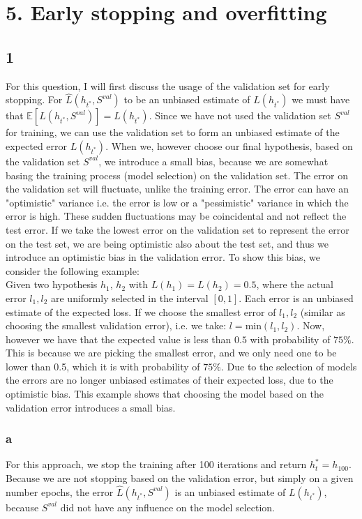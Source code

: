 \documentclass{article}
\begin{document}
\section{5. Early stopping and overfitting}
\subsection{1}
% 
% 
For this question, I will first discuss the usage of the validation set for early stopping. For $\hat{L}(h_{t^*},S^{val})$ to be an unbiased estimate of $L(h_{t^*})$ we must have that $\mathbb{E}[\hat{L}(h_{t^*},S^{val})] = L(h_{t^*})$. Since we have not used the validation set $S^{val}$ for training, we can use the validation set to form an unbiased estimate of the expected error $L(h_{t^*})$. When we, however choose our final hypothesis, based on the validation set $S^{val}$, we introduce a small bias, because we are somewhat basing the training process (model selection) on the validation set. The error on the validation set will fluctuate, unlike the training error. The error can have an "optimistic" variance i.e. the error is low or a "pessimistic" variance in which the error is high. These sudden fluctuations may be coincidental and not reflect the test error. If we take the lowest error on the validation set to represent the error on the test set, we are being optimistic also about the test set, and thus we introduce an optimistic bias in the validation error. To show this bias, we consider the following example:\\
Given two hypothesis $h_1$, $h_2$ with $L(h_1) = L(h_2) = 0.5$, where the actual error $l_1, l_2$ are uniformly selected in the interval $[0,1]$. Each error is an unbiased estimate of the expected loss. If we choose the smallest error of $l_1, l_2$ (similar as choosing the smallest validation error), i.e. we take: $l= \text{min}(l_1,l_2)$. Now, however we have that the expected value is less than $0.5$ with probability of $75\%$. This is because we are picking the smallest error, and we only need one to be lower than 0.5, which it is with probability of $75\%$. Due to the selection of models the errors are no longer unbiased estimates of their expected loss, due to the optimistic bias. This example shows that choosing the model based on the validation error introduces a small bias.
\subsubsection{a}
For this approach, we stop the training after 100 iterations and return $h_t^* = h_{100}$. Because we are not stopping based on the validation error, but simply on a given number epochs, the error $\hat{L}(h_{t^*},S^{val})$ is an unbiased estimate of $L(h_{t^*})$, because $S^{val}$ did not have any influence on the model selection.
\end{document}

